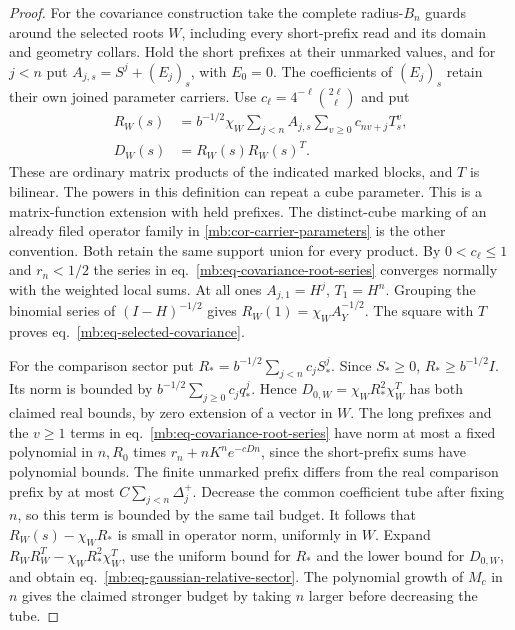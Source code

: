 \documentclass[11pt,letterpaper,reqno]{amsart}
\numberwithin{equation}{section}
\renewcommand{\eqref}[1]{\textup{eq.~\ref{#1}}}
\theoremstyle{definition}
\theoremstyle{remark}
\begin{document}
\begin{proof}
For the covariance construction take the complete radius-\(B_n\) guards around the selected roots \(W\), including every short-prefix read and its domain and geometry collars. Hold the short prefixes at their unmarked values, and for \(j<n\) put \(A_{j,s}=S^j+(E_j)_s\), with \(E_0=0\). The coefficients of \((E_j)_s\) retain their own joined parameter carriers. Use \(c_\ell=4^{-\ell}\binom{2\ell}{\ell}\) and put
\begin{equation}\label{mb:eq-covariance-root-series}
 \begin{aligned}
 R_W(s)&=b^{-1/2}\chi_W
             \sum_{j<n} A_{j,s}\sum_{v\ge0}c_{nv+j}T_s^v,\\
 D_W(s)&=R_W(s)R_W(s)^T .
 \end{aligned}
\end{equation}
These are ordinary matrix products of the indicated marked blocks, and \(T\) is bilinear. The powers in this definition can repeat a cube parameter. This is a matrix-function extension with held prefixes. The distinct-cube marking of an already filed operator family in \cref{mb:cor-carrier-parameters} is the other convention. Both retain the same support union for every product. By \(0<c_\ell\le1\) and \(r_n<1/2\) the series in \eqref{mb:eq-covariance-root-series} converges normally with the weighted local sums. At all ones \(A_{j,1}=H^j\), \(T_1=H^n\). Grouping the binomial series of \((I-H)^{-1/2}\) gives \(R_W(1)=\chi_W A_Y^{-1/2}\). The square with \(T\) proves \eqref{mb:eq-selected-covariance}.

For the comparison sector put \(R_*=b^{-1/2}\sum_{j<n}c_jS_*^j\). Since \(S_*\ge0\), \(R_*\ge b^{-1/2}I\). Its norm is bounded by \(b^{-1/2}\sum_{j\ge0}c_jq_*^j\). Hence \(D_{0,W}=\chi_W R_*^2\chi_W^T\) has both claimed real bounds, by zero extension of a vector in \(W\). The long prefixes and the \(v\ge1\) terms in \eqref{mb:eq-covariance-root-series} have norm at most a fixed polynomial in \(n,R_0\) times \(r_n+nK^n e^{-cDn}\), since the short-prefix sums have polynomial bounds. The finite unmarked prefix differs from the real comparison prefix by at most \(C\sum_{j<n}\Delta_j^+\). Decrease the common coefficient tube after fixing \(n\), so this term is bounded by the same tail budget. It follows that \(R_W(s)-\chi_W R_*\) is small in operator norm, uniformly in \(W\). Expand \(R_W R_W^T-\chi_W R_*^2\chi_W^T\), use the uniform bound for \(R_*\) and the lower bound for \(D_{0,W}\), and obtain \eqref{mb:eq-gaussian-relative-sector}. The polynomial growth of \(M_c\) in \(n\) gives the claimed stronger budget by taking \(n\) larger before decreasing the tube.


\end{proof}
\end{document}
